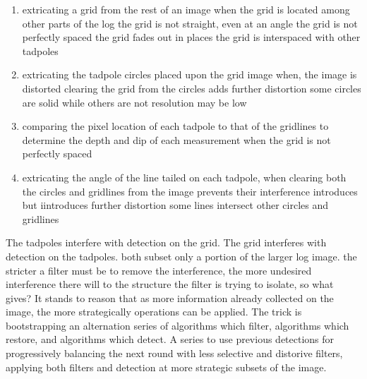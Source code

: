 \documentclass{article}
\begin{document}
\begin{enumerate}
    \item extricating a grid from the rest of an image when
        \subitem the grid is located among other parts of the log
        \subitem the grid is not straight, even at an angle
        \subitem the grid is not perfectly spaced
        \subitem the grid fades out in places
        \subitem the grid is interspaced with other tadpoles

    \item extricating the tadpole circles placed upon the grid image when, 
        \subitem the image is distorted
        \subitem clearing the grid from the circles adds further distortion
        \subitem some circles are solid while others are not          
        \subitem resolution may be low

    \item comparing the pixel location of each tadpole to that of the gridlines to determine the depth and dip of each measurement when
        \subitem the grid is not perfectly spaced   

    \item extricating the angle of the line tailed on each tadpole, when
        \subitem clearing both the circles and gridlines from the image prevents their
        interference introduces but iintroduces further distortion
        \subitem some lines intersect other circles and gridlines   
\end{enumerate}
    
          




The tadpoles interfere with detection on the grid. The grid interferes with detection on the tadpoles. both subset only a portion of the larger log image. 
the stricter a filter must be to remove the interference, the more undesired interference there will to the structure the filter is trying to isolate, so what gives? 
It stands to reason that as more information already collected on the image, the more strategically operations can be applied. The trick is bootstrapping an 
alternation series of algorithms which filter, algorithms which restore, and  algorithms which detect.  A series to use previous detections 
for progressively balancing the next round with less selective and distorive filters, applying both filters and detection at more strategic subsets of the image.
\end{document}
